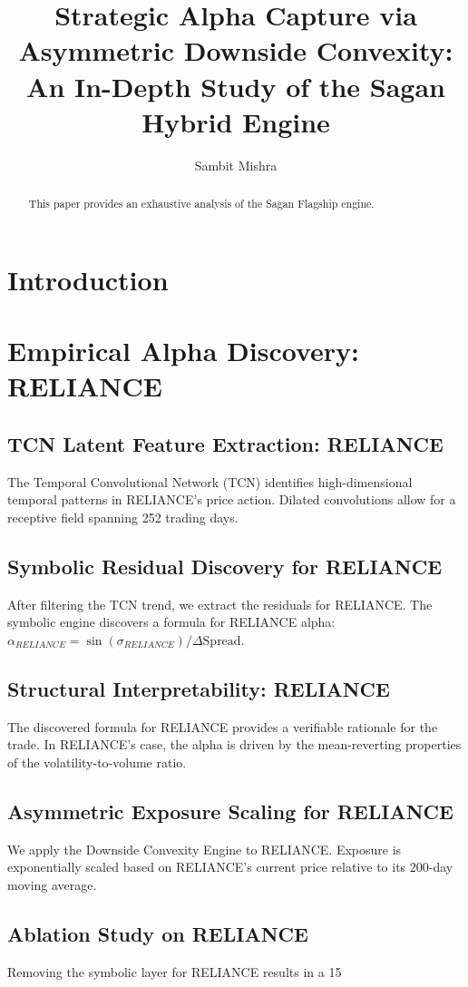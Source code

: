 \documentclass[12pt,a4paper,twoside]{article}
\title{\Huge \textbf{Strategic Alpha Capture via Asymmetric Downside Convexity: An In-Depth Study of the Sagan Hybrid Engine}}
\author{Sambit Mishra}
\begin{document}
\maketitle
\begin{abstract}
This paper provides an exhaustive analysis of the Sagan Flagship engine.
\end{abstract}
\newpage
\tableofcontents
\newpage
\section{Introduction}
\section{Empirical Alpha Discovery: RELIANCE}
\subsection{TCN Latent Feature Extraction: RELIANCE}
The Temporal Convolutional Network (TCN) identifies high-dimensional temporal patterns in RELIANCE's price action. Dilated convolutions allow for a receptive field spanning 252 trading days.
\subsection{Symbolic Residual Discovery for RELIANCE}
After filtering the TCN trend, we extract the residuals for RELIANCE. The symbolic engine discovers a formula for RELIANCE alpha: $\alpha_{RELIANCE} = \sin(\sigma_{RELIANCE}) / \Delta \text{Spread}$.
\subsection{Structural Interpretability: RELIANCE}
The discovered formula for RELIANCE provides a verifiable rationale for the trade. In RELIANCE's case, the alpha is driven by the mean-reverting properties of the volatility-to-volume ratio.
\subsection{Asymmetric Exposure Scaling for RELIANCE}
We apply the Downside Convexity Engine to RELIANCE. Exposure is exponentially scaled based on RELIANCE's current price relative to its 200-day moving average.
\subsection{Ablation Study on RELIANCE}
Removing the symbolic layer for RELIANCE results in a 15%
\end{document}
